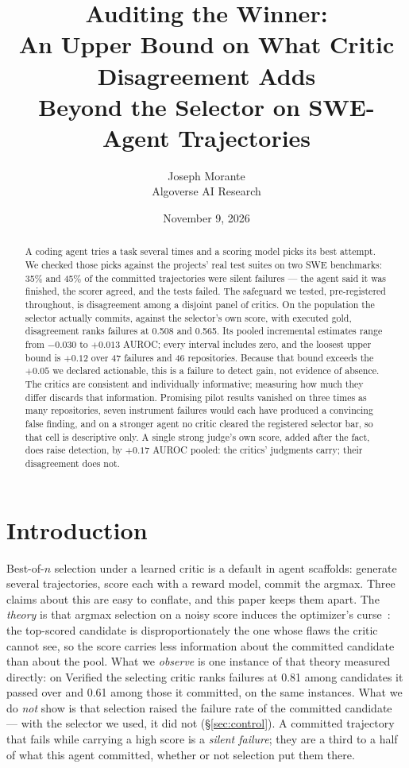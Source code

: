 \documentclass[10pt]{article}
\title{\textbf{Auditing the Winner:\\[2pt] An Upper Bound on What Critic Disagreement Adds\\ Beyond the Selector on SWE-Agent Trajectories}}
\author{Joseph Morante\\ \small Algoverse AI Research}
\date{\small November 9, 2026}
\begin{document}
\maketitle

\begin{abstract}
A coding agent tries a task several times and a scoring model picks its best attempt. We checked those picks against the projects' real test suites on two SWE benchmarks: 35\% and 45\% of the committed trajectories were silent failures --- the agent said it was finished, the scorer agreed, and the tests failed. The safeguard we tested, pre-registered throughout, is disagreement among a disjoint panel of critics. On the population the selector actually commits, against the selector's own score, with executed gold, disagreement ranks failures at 0.508 and 0.565. Its pooled incremental estimates range from $-0.030$ to $+0.013$ AUROC; every interval includes zero, and the loosest upper bound is $+0.12$ over 47 failures and 46 repositories. Because that bound exceeds the $+0.05$ we declared actionable, this is a failure to detect gain, not evidence of absence. The critics are consistent and individually informative; measuring how much they differ discards that information. Promising pilot results vanished on three times as many repositories, seven instrument failures would each have produced a convincing false finding, and on a stronger agent no critic cleared the registered selector bar, so that cell is descriptive only. A single strong judge's own score, added after the fact, does raise detection, by $+0.17$ AUROC pooled: the critics' judgments carry; their disagreement does not.
\end{abstract}

\section{Introduction}
Best-of-$n$ selection under a learned critic is a default in agent scaffolds: generate several trajectories, score each with a reward model, commit the argmax. Three claims about this are easy to conflate, and this paper keeps them apart. The \emph{theory} is that argmax selection on a noisy score induces the optimizer's curse~\citep{smith2006optimizer}: the top-scored candidate is disproportionately the one whose flaws the critic cannot see, so the score carries less information about the committed candidate than about the pool. What we \emph{observe} is one instance of that theory measured directly: on Verified the selecting critic ranks failures at 0.81 among candidates it passed over and 0.61 among those it committed, on the same instances. What we do \emph{not} show is that selection raised the failure rate of the committed candidate --- with the selector we used, it did not (\S\ref{sec:control}). A committed trajectory that fails while carrying a high score is a \emph{silent failure}; they are a third to a half of what this agent committed, whether or not selection put them there.
\end{document}
